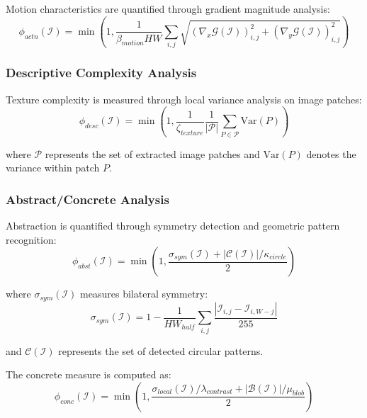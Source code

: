 \documentclass[11pt,a4paper]{article}
\begin{document}
Motion characteristics are quantified through gradient magnitude analysis:
\begin{equation}
\phi_{actn}(\mathcal{I}) = \min\left(1, \frac{1}{\beta_{motion}HW} \sum_{i,j} \sqrt{(\nabla_x \mathcal{G}(\mathcal{I}))_{i,j}^2 + (\nabla_y \mathcal{G}(\mathcal{I}))_{i,j}^2}\right)
\label{eq:action-measure}
\end{equation}

\subsubsection{Descriptive Complexity Analysis}

Texture complexity is measured through local variance analysis on image patches:
\begin{equation}
\phi_{desc}(\mathcal{I}) = \min\left(1, \frac{1}{\zeta_{texture}} \frac{1}{|\mathcal{P}|} \sum_{P \in \mathcal{P}} \text{Var}(P)\right)
\label{eq:descriptive-measure}
\end{equation}

where $\mathcal{P}$ represents the set of extracted image patches and $\text{Var}(P)$ denotes the variance within patch $P$.

\subsubsection{Abstract/Concrete Analysis}

Abstraction is quantified through symmetry detection and geometric pattern recognition:
\begin{equation}
\phi_{abst}(\mathcal{I}) = \min\left(1, \frac{\sigma_{sym}(\mathcal{I}) + |\mathcal{C}(\mathcal{I})|/\kappa_{circle}}{2}\right)
\label{eq:abstract-measure}
\end{equation}

where $\sigma_{sym}(\mathcal{I})$ measures bilateral symmetry:
\begin{equation}
\sigma_{sym}(\mathcal{I}) = 1 - \frac{1}{HW_{half}} \sum_{i,j} \frac{|\mathcal{I}_{i,j} - \mathcal{I}_{i,W-j}|}{255}
\label{eq:symmetry-measure}
\end{equation}

and $\mathcal{C}(\mathcal{I})$ represents the set of detected circular patterns.

The concrete measure is computed as:
\begin{equation}
\phi_{conc}(\mathcal{I}) = \min\left(1, \frac{\sigma_{local}(\mathcal{I})/\lambda_{contrast} + |\mathcal{B}(\mathcal{I})|/\mu_{blob}}{2}\right)
\label{eq:concrete-measure}
\end{equation}
\end{document}
